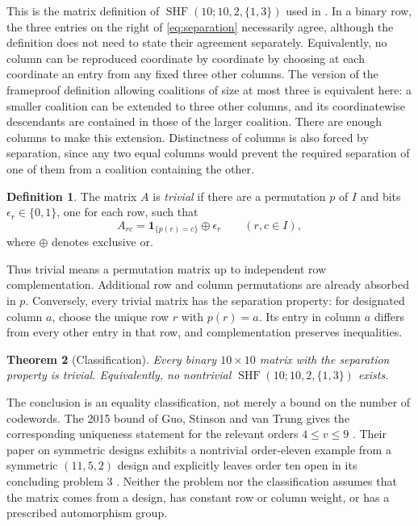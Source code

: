 \documentclass[11pt]{article}
\newtheorem{theorem}{Theorem}[section]
\theoremstyle{definition}
\newtheorem{definition}[theorem]{Definition}
\theoremstyle{remark}
\newcommand{\bits}{\{0,1\}}
\newcommand{\I}{I}
\newcommand{\shf}{\operatorname{SHF}}
\newcommand{\ind}[1]{\mathbf{1}_{\{#1\}}}
\begin{document}
This is the matrix definition of $\shf(10;10,2,\{1,3\})$ used in
\cite{designs2015}. In a binary row, the three entries on the right of
\eqref{eq:separation} necessarily agree, although the definition does not
need to state their agreement separately. Equivalently, no column can be
reproduced coordinate by coordinate by choosing at each coordinate an
entry from any fixed three other columns. The version of the frameproof
definition allowing coalitions of size at most three is equivalent here:
a smaller coalition can be extended to three other columns, and its
coordinatewise descendants are contained in those of the larger
coalition. There are enough columns to make this extension. Distinctness
of columns is also forced by separation, since any two equal columns
would prevent the required separation of one of them from a coalition
containing the other.

\begin{definition}
\label{def:trivial}
The matrix $A$ is \emph{trivial} if there are a permutation $p$ of $\I$
and bits $\epsilon_r\in\bits$, one for each row, such that
\begin{equation}
\label{eq:trivial}
 A_{rc}=\ind{p(r)=c}\mathbin{\oplus}\epsilon_r
 \qquad(r,c\in\I),
\end{equation}
where $\oplus$ denotes exclusive or.
\end{definition}

Thus trivial means a permutation matrix up to independent row
complementation. Additional row and column permutations are already
absorbed in $p$. Conversely, every trivial matrix has the separation
property: for designated column $a$, choose the unique row $r$ with
$p(r)=a$. Its entry in column $a$ differs from every other entry in that
row, and complementation preserves inequalities.

\begin{theorem}[Classification]
\label{thm:main}
Every binary $10\times10$ matrix with the separation property is trivial.
Equivalently, no nontrivial $\shf(10;10,2,\{1,3\})$ exists.
\end{theorem}

The conclusion is an equality classification, not merely a bound on the
number of codewords. The 2015 bound of Guo, Stinson and van Trung gives
the corresponding uniqueness statement for the relevant orders
$4\leq v\leq9$
\cite{bounds2015}. Their paper on symmetric designs exhibits a
nontrivial order-eleven example from a symmetric $(11,5,2)$ design and
explicitly leaves order ten open in its concluding problem 3
\cite{designs2015}. Neither the problem nor the classification
assumes that the matrix comes from a design, has constant row or column
weight, or has a prescribed automorphism group.
\end{document}
